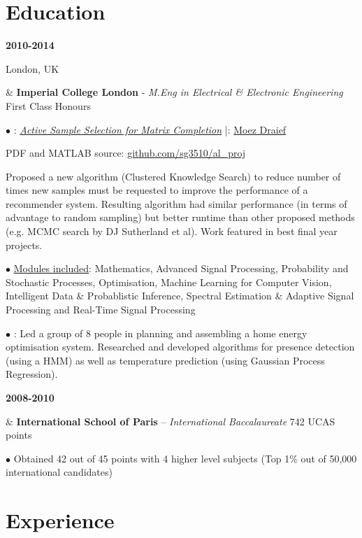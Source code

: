 \documentclass[a4paper,10pt,oneside]{article}
\begin{document}
\section*{Education}
\begin{body}

{\textbf{2010-2014} \par London, UK} & \textbf{Imperial College London} - \textit{M.Eng in Electrical \& Electronic Engineering} \hfill First Class Honours 


$\bullet$ \underline{}: \href{http://sg3510.github.io/al_proj/Report/thesis.pdf}{\textit{Active Sample Selection for Matrix Completion}} \hfill|\hfill  \underline{}: \href{http://www.iis.ee.ic.ac.uk/m.draief}{Moez Draief}

PDF and MATLAB source: \href{https://github.com/sg3510/al_proj}{github.com/sg3510/al\_proj} \faChain

Proposed a new algorithm (Clustered Knowledge Search) to reduce number of times new samples must be requested to improve the performance of a recommender system. Resulting algorithm had similar performance (in terms of advantage to random sampling) but better runtime than other proposed methods (e.g. MCMC search by DJ Sutherland et al). Work featured in best final year projects.

$\bullet$ \underline{Modules included}: Mathematics, Advanced Signal Processing, Probability and Stochastic Processes, Optimisation, Machine Learning for Computer Vision, Intelligent Data \& Probablistic Inference, Spectral Estimation \& Adaptive Signal Processing and Real-Time Signal Processing


$\bullet$ \href{https://github.com/sg3510/home-automation-yr3proj}{\underline{}}: Led a group of 8 people in planning and assembling a home energy optimisation system. Researched and developed algorithms for presence detection (using a HMM) as well as temperature prediction (using Gaussian Process Regression).
\\ 
{\textbf{2008-2010} \par {} } & \textbf{International School of Paris} – \textit{International Baccalaureate} \hfill 742 UCAS points

$\bullet$ Obtained 42 out of 45 points with 4 higher level subjects (Top 1\% out of 50,000 international candidates)

\end{body}


\section*{Experience}
\end{document}
